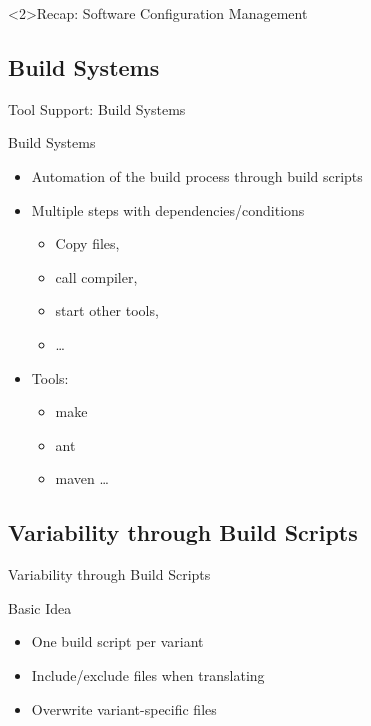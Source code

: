 
\begin{frame}<2>{Recap: Software Configuration Management}
	\frameSoftwareConfigurationManagement
\end{frame}

\subsection{Build Systems}

\begin{frame}{Tool Support: Build Systems}
	\begin{mycolumns}[widths={40},animation=none]
		\begin{definition}{Build Systems} %
			\begin{itemize}
				\item Automation of the build process through build scripts
				\item Multiple steps with dependencies/conditions
				\begin{itemize}
					\item Copy files, 
					\item call compiler, 
					\item start other tools, 
					\item \ldots
				\end{itemize}
				\item Tools: 
				\begin{itemize}
					\item make
					\item ant
					\item maven
					\ldots
				\end{itemize}
			\end{itemize}
		\end{definition}
	\mynextcolumn
	\end{mycolumns}	
\end{frame}

\subsection{Variability through Build Scripts}

\begin{frame}{Variability through Build Scripts}
	\vspace{-\textheightoftitle}
	\begin{mycolumns}
		\begin{note}{Basic Idea}
			\begin{itemize}
				\item One build script per variant
				\item Include/exclude files when translating
				\item Overwrite variant-specific files
			\end{itemize}
		\end{note}
	\mynextcolumn
		\centering{}
	\end{mycolumns}	
\end{frame}


